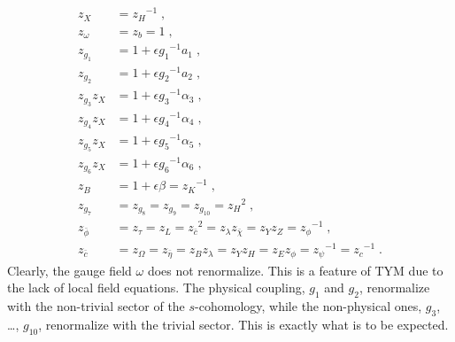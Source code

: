 \documentclass[../main.tex]{subfiles}
\begin{document}
\begin{subequations}%
  \label{eq:z-factors}
  \begin{align}
    z_{ X }               & = { z_{ H } }^{ -1 } \;,                                                                                                                          \\
    z_{ \omega }          & = z_{ b } = 1 \;,                                                                                                                                 \\
    z_{ g_{ 1 } }         & = 1 + \epsilon { g_{ 1 } }^{ -1 } a_{ 1 } \;,                                                                                                     \\
    z_{ g_{ 2 } }         & = 1 + \epsilon { g_{ 2 } }^{ -1 } a_{ 2 } \;,                                                                                                     \\
    z_{ g_{ 3 } } z_{ X } & = 1 + \epsilon { g_{ 3 } }^{ -1 } \alpha_{ 3 } \;,                                                                                                \\
    z_{ g_{ 4 } } z_{ X } & = 1 + \epsilon { g_{ 4 } }^{ -1 } \alpha_{ 4 } \;,                                                                                                \\
    z_{ g_{ 5 } } z_{ X } & = 1 + \epsilon { g_{ 5 } }^{ -1 } \alpha_{ 5 } \;,                                                                                                \\
    z_{ g_{ 6 } } z_{ X } & = 1 + \epsilon { g_{ 6 } }^{ -1 } \alpha_{ 6 } \;,                                                                                                \\
    z_{ B }               & = 1 + \epsilon \beta = { z_{ K } }^{ -1 } \;,                                                                                                     \\
    z_{ g_{ 7 } }         & = z_{ g_{ 8 } } =  z_{ g_{ 9 } } = z_{ g_{ 10 } }  = { z_{ H } }^{ 2 } \;,                                                                        \\
    z_{ \bar{ \phi } }    & = z_{ \tau } = z_{ L } = {z_{ \bar{ c } }}^{ 2 } = z_{ \lambda } z_{ \bar{ \chi } } = z_{ Y } z_{ Z } = {z_{ \phi } }^{ -1 } \;,                  \\
    z_{ \bar{ c } }       & = z_{ \Omega } = z_{ \bar{ \eta } } = z_{ B } z_{ \lambda } = z_{ Y } z_{ H } = z_{ E } z_{ \phi } = {z_{ \psi } }^{ -1 } = {z_{ c } }^{ -1 } \;.
  \end{align}
\end{subequations}
Clearly, the gauge field $ \omega $ does not renormalize. This is a feature of TYM due to the lack of local field equations. The physical coupling, $ g_1 $ and $ g_2 $, renormalize with the non-trivial sector of the $ s $-cohomology, while the non-physical ones, $ g_3 $, \ldots, $ g_{10} $, renormalize with the trivial sector. This is exactly what is to be expected.
\end{document}
